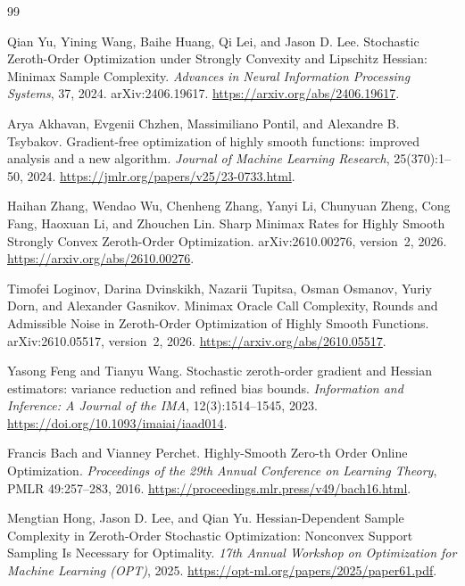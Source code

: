 \documentclass[11pt,a4paper]{article}
\theoremstyle{definition}
\theoremstyle{remark}
\begin{document}
\begin{thebibliography}{99}

Qian Yu, Yining Wang, Baihe Huang, Qi Lei, and Jason D. Lee.
\newblock Stochastic Zeroth-Order Optimization under Strongly Convexity and Lipschitz Hessian: Minimax Sample Complexity.
\newblock \emph{Advances in Neural Information Processing Systems}, 37, 2024.
\newblock arXiv:2406.19617.
\newblock \url{https://arxiv.org/abs/2406.19617}.

Arya Akhavan, Evgenii Chzhen, Massimiliano Pontil, and Alexandre B. Tsybakov.
\newblock Gradient-free optimization of highly smooth functions: improved analysis and a new algorithm.
\newblock \emph{Journal of Machine Learning Research}, 25(370):1--50, 2024.
\newblock \url{https://jmlr.org/papers/v25/23-0733.html}.

Haihan Zhang, Wendao Wu, Chenheng Zhang, Yanyi Li, Chunyuan Zheng, Cong Fang, Haoxuan Li, and Zhouchen Lin.
\newblock Sharp Minimax Rates for Highly Smooth Strongly Convex Zeroth-Order Optimization.
\newblock arXiv:2610.00276, version~2, 2026.
\newblock \url{https://arxiv.org/abs/2610.00276}.

Timofei Loginov, Darina Dvinskikh, Nazarii Tupitsa, Osman Osmanov, Yuriy Dorn, and Alexander Gasnikov.
\newblock Minimax Oracle Call Complexity, Rounds and Admissible Noise in Zeroth-Order Optimization of Highly Smooth Functions.
\newblock arXiv:2610.05517, version~2, 2026.
\newblock \url{https://arxiv.org/abs/2610.05517}.

Yasong Feng and Tianyu Wang.
\newblock Stochastic zeroth-order gradient and Hessian estimators: variance reduction and refined bias bounds.
\newblock \emph{Information and Inference: A Journal of the IMA}, 12(3):1514--1545, 2023.
\newblock \url{https://doi.org/10.1093/imaiai/iaad014}.

Francis Bach and Vianney Perchet.
\newblock Highly-Smooth Zero-th Order Online Optimization.
\newblock \emph{Proceedings of the 29th Annual Conference on Learning Theory}, PMLR 49:257--283, 2016.
\newblock \url{https://proceedings.mlr.press/v49/bach16.html}.

Mengtian Hong, Jason D. Lee, and Qian Yu.
\newblock Hessian-Dependent Sample Complexity in Zeroth-Order Stochastic Optimization: Nonconvex Support Sampling Is Necessary for Optimality.
\newblock \emph{17th Annual Workshop on Optimization for Machine Learning (OPT)}, 2025.
\newblock \url{https://opt-ml.org/papers/2025/paper61.pdf}.


\end{thebibliography}
\end{document}

